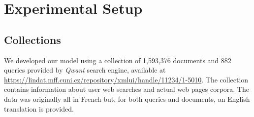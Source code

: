 
\section{Experimental Setup}
\label{sec:setup}

\subsection{Collections}
We developed our model using a collection of 1,593,376 documents and 882 queries provided by \textit{Qwant} search engine, available at \url{https://lindat.mff.cuni.cz/repository/xmlui/handle/11234/1-5010}.
\newline
The collection contains information about user web searches and actual web pages corpora. The data was originally all in French but, for both queries and documents, an English translation is provided.


